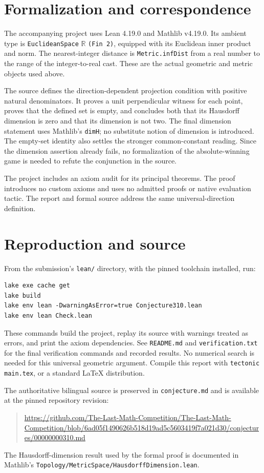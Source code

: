 \documentclass[11pt]{article}
\newcommand{\R}{\mathbb R}
\begin{document}
\section{Formalization and correspondence}
The accompanying project uses Lean 4.19.0 and Mathlib v4.19.0. Its ambient type is \texttt{EuclideanSpace} $\R$ \texttt{(Fin 2)}, equipped with its Euclidean inner product and norm. The nearest-integer distance is \texttt{Metric.infDist} from a real number to the range of the integer-to-real cast. These are the actual geometric and metric objects used above.

The source defines the direction-dependent projection condition with positive natural denominators. It proves a unit perpendicular witness for each point, proves that the defined set is empty, and concludes both that its Hausdorff dimension is zero and that its dimension is not two. The final dimension statement uses Mathlib's \texttt{dimH}; no substitute notion of dimension is introduced. The empty-set identity also settles the stronger common-constant reading. Since the dimension assertion already fails, no formalization of the absolute-winning game is needed to refute the conjunction in the source.

The project includes an axiom audit for its principal theorems. The proof introduces no custom axioms and uses no admitted proofs or native evaluation tactic. The report and formal source address the same universal-direction definition.

\section{Reproduction and source}
From the submission's \texttt{lean/} directory, with the pinned toolchain installed, run:
\begin{verbatim}
lake exe cache get
lake build
lake env lean -DwarningAsError=true Conjecture310.lean
lake env lean Check.lean
\end{verbatim}
These commands build the project, replay its source with warnings treated as errors, and print the axiom dependencies. See \texttt{README.md} and \texttt{verification.txt} for the final verification commands and recorded results. No numerical search is needed for this universal geometric argument. Compile this report with \texttt{tectonic main.tex}, or a standard LaTeX distribution.

The authoritative bilingual source is preserved in \texttt{conjecture.md} and is available at the pinned repository revision:
\begin{quote}\small
\url{https://github.com/The-Last-Math-Competition/The-Last-Math-Competition/blob/6ad05f1490626b518d19ad5c5603419f7a021d30/conjectures/00000000310.md}
\end{quote}
The Hausdorff-dimension result used by the formal proof is documented in Mathlib's \texttt{Topology/MetricSpace/HausdorffDimension.lean}.
\end{document}
